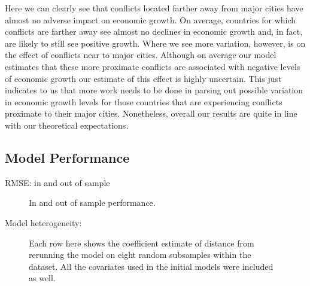 Here we can clearly see that conflicts located farther away from major cities have almost no adverse impact on economic growth. On average, countries for which conflicts are farther away see almost no declines in economic growth and, in fact, are likely to still see positive growth. Where we see more variation, however, is on the effect of conflicts near to major cities. Although on average our model estimates that these more proximate conflicts are associated with negative levels of economic growth our estimate of this effect is highly uncertain. This just indicates to us that more work needs to be done in parsing out possible variation in economic growth levels for those countries that are experiencing conflicts proximate to their major cities. Nonetheless, overall our results are quite in line with our theoretical expectations.

\subsection{Model Performance}

RMSE: in and out of sample

\begin{figure}
	\centering
	\resizebox{.8\textwidth}{!}{}
	\caption{In and out of sample performance.}
	\label{fig:rmsePlot}
\end{figure}

Model heterogeneity: 

\begin{figure}
	\centering
	\resizebox{.8\textwidth}{!}{}
	\caption{Each row here shows the coefficient estimate of distance from rerunning the model on eight random subsamples within the dataset. All the covariates used in the initial models were included as well.}
	\label{fig:crossPlot}
\end{figure}